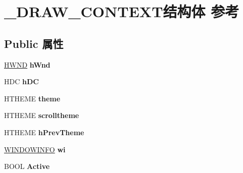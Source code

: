 \hypertarget{struct___d_r_a_w___c_o_n_t_e_x_t}{}\section{\+\_\+\+D\+R\+A\+W\+\_\+\+C\+O\+N\+T\+E\+X\+T结构体 参考}
\label{struct___d_r_a_w___c_o_n_t_e_x_t}
\subsection*{Public 属性}
\begin{DoxyCompactItemize}
\item 
\mbox{\label{struct___d_r_a_w___c_o_n_t_e_x_t_a7bf89529940d85b7ee87bd69fae2d492}} 
\hyperlink{interfacevoid}{H\+W\+ND} {\bfseries h\+Wnd}
\item 
\mbox{\label{struct___d_r_a_w___c_o_n_t_e_x_t_a63e5fc3e9d585374613777c29a32a699}} 
H\+DC {\bfseries h\+DC}
\item 
\mbox{\label{struct___d_r_a_w___c_o_n_t_e_x_t_a2744e225adc9029f58cbf531b2878e65}} 
H\+T\+H\+E\+ME {\bfseries theme}
\item 
\mbox{\label{struct___d_r_a_w___c_o_n_t_e_x_t_a71e9107562f7061f1db501c6fb24525c}} 
H\+T\+H\+E\+ME {\bfseries scrolltheme}
\item 
\mbox{\label{struct___d_r_a_w___c_o_n_t_e_x_t_a0e94b45bbe7005540e33fe0c5ce92d46}} 
H\+T\+H\+E\+ME {\bfseries h\+Prev\+Theme}
\item 
\mbox{\label{struct___d_r_a_w___c_o_n_t_e_x_t_a0ae92946fca186c0303696b9b0cc389f}} 
\hyperlink{structtag_w_i_n_d_o_w_i_n_f_o}{W\+I\+N\+D\+O\+W\+I\+N\+FO} {\bfseries wi}
\item 
\mbox{\label{struct___d_r_a_w___c_o_n_t_e_x_t_ade99153ceaaaaec224ef8f2e7e64bb43}} 
B\+O\+OL {\bfseries Active}
\item 
\mbox{\label{struct___d_r_a_w___c_o_n_t_e_x_t_a05a78446866dbac5f8f6944df7399428}} 

\end{DoxyCompactItemize}
